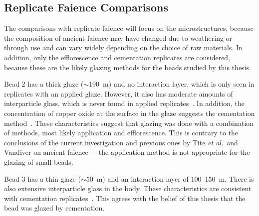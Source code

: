 \subsection{Replicate Faience Comparisons}

The comparisons with replicate faience will focus on the microstructures, because the composition of ancient faience may have changed due to weathering or through use and can vary widely depending on the choice of raw materials. In addition, only the efflorescence and cementation replicates are considered, because these are the likely glazing methods for the beads studied by this thesis.

Bead 2 has a thick glaze ($\sim$190~\textmu m) and no interaction layer, which is only seen in replicates with an applied glaze. However, it also has moderate amounts of interparticle glass, which is never found in applied replicates~\cite{tite86,vandiver98}. In addition, the concentration of copper oxide at the surface in the glaze suggests the cementation method~\cite{vandiver98}. These characteristics suggest that glazing was done with a combination of methods, most likely application and efflorescence. This is contrary to the conclusions of the current investigation and previous ones by Tite \emph{et al.}\ and Vandiver on ancient faience~\cite{tite07,vandiver98,tite86}---the application method is not appropriate for the glazing of small beads.

Bead 3 has a thin glaze ($\sim$50~\textmu m) and an interaction layer of 100--150~\textmu m. There is also extensive interparticle glass in the body. These characteristics are consistent with cementation replicates~\cite{vandiver98,tite83,tite86,tite07}. This agrees with the belief of this thesis that the bead was glazed by cementation.